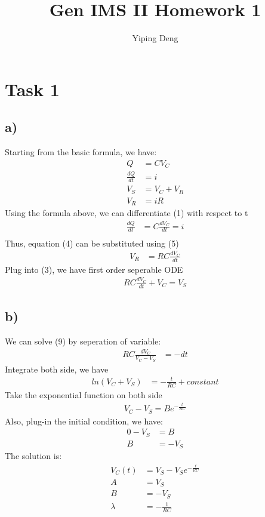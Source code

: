 \documentclass{article}
\newcommand{\hwnumber}{1}
\begin{document}
\title{Gen IMS II Homework \hwnumber}
\author{Yiping Deng}
\maketitle
\thispagestyle{fancy}
\section*{Task 1}
\subsection*{a)}
Starting from the basic formula, we have:
\begin{align}
    Q &= CV_C \\
    \frac{dQ}{dt} &= i \\
    V_S &= V_C + V_R \\
    V_R &= iR
\end{align}
Using the formula above, we can differentiate (1) with respect to t
\begin{align}
    \frac{dQ}{dt} &= C \frac{dV_C}{dt} = i \\
\end{align}
Thus, equation (4) can be substituted using (5)
\begin{align}
    V_R &= R C \frac{dV_C}{dt}
\end{align}
Plug into (3), we have first order seperable ODE
\begin{align}
    RC \frac{dV_C}{dt} + V_C = V_S
\end{align}
\subsection*{b)}
We can solve (9) by seperation of variable:
\begin{align}
    RC \frac{dV_C}{V_C - V_S} &= -dt
\end{align}
Integrate both side, we have
\begin{align}
    ln(V_C + V_S) &= -\frac{t}{RC} + constant
\end{align}
Take the exponential function on both side
\begin{align}
    V_C - V_S = B e^{-\frac{t}{RC}}
\end{align}
Also, plug-in the initial condition, we have:
\begin{align}
    0  - V_S &= B \\
    B &= -V_S
\end{align}
The solution is:
\begin{align}
    V_C(t) &= V_S - V_S e^{-\frac{t}{RC}} \\
    A &= V_S \\
    B &= -V_S \\
    \lambda &= -\frac{1}{RC} \\
\end{align}
\end{document}
